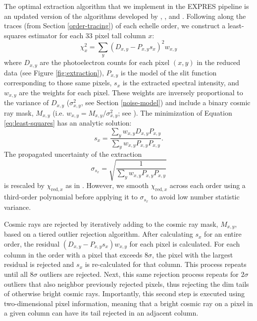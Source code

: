 The optimal extraction algorithm that we implement in the EXPRES pipeline is an updated version of the algorithms developed by \citet{horne_optimal_1986}, \citet{piskunov_new_2002}, and \citet{zechmeister_flat-relative_2014}. Following along the traces (from Section \ref{order-tracing}) of each echelle order, we construct a least-squares estimator for each 33 pixel tall column $x$:
\begin{equation}
    \chi_x^2 = \sum_y ( D_{x,y} - P_{x,y} s_x )^2  w_{x,y}
    \label{eq:least-squares}
\end{equation}
where $D_{x,y}$ are the photoelectron counts for each pixel $(x,y)$ in the reduced data (see Figure \ref{fig:extraction}), $P_{x,y}$ is the model of the slit function corresponding to those same pixels, $s_x$ is the extracted spectral intensity, and $w_{x,y}$ are the weights for each pixel. These weights are inversely proportional to the variance of $D_{x,y}$ ($\sigma_{x,y}^2$, see Section \ref{noise-model}) and include a binary cosmic ray mask, $M_{x,y}$ (i.e. $w_{x,y} = M_{x,y} / \sigma^2_{x,y}$; see \citealt{zechmeister_flat-relative_2014}). The minimization of Equation \ref{eq:least-squares} has an analytic solution:
\begin{equation}
    s_x = \frac{\sum_y w_{x,y} D_{x,y} P_{x,y} }{\sum_y w_{x,y} P_{x,y} P_{x,y} }.
    \label{eq:least-squares-soln}
\end{equation}
The propagated uncertainty of the extraction
\begin{equation}
    \sigma_{s_x} = \sqrt{\frac{1}{\sum_y w_{x,y} P_{x,y} P_{x,y}}}
\end{equation}
is rescaled by $\chi_{\mathrm{red,}x}$ as in \citet{zechmeister_flat-relative_2014}. However, we smooth $\chi_{\mathrm{red,}x}$ across each order using a third-order polynomial before applying it to $\sigma_{s_x}$ to avoid low number statistic variance.

Cosmic rays are rejected by iteratively adding to the cosmic ray mask, $M_{x,y}$, based on a tiered outlier rejection algorithm. After calculating $s_x$ for an entire order, the residual \((D_{x,y}-P_{x,y}s_x)w_{x,y}\) for each pixel is calculated. For each column in the order with a pixel that exceeds $8\sigma$, the pixel with the largest residual is rejected and $s_x$ is re-calculated for that column. This process repeats until all $8\sigma$ outliers are rejected. Next, this same rejection process repeats for $2\sigma$ outliers that also neighbor previously rejected pixels, thus rejecting the dim tails of otherwise bright cosmic rays. Importantly, this second step is executed using two-dimensional pixel information, meaning that a bright cosmic ray on a pixel in a given column can have its tail rejected in an adjacent column.

